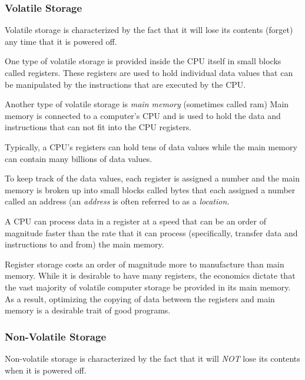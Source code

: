 \subsubsection{Volatile Storage}
\label{VolatileStorage}

Volatile storage is characterized by the fact that it will lose its
contents (forget) any time that it is powered off.

One type of volatile storage is provided inside the CPU itself in 
small blocks called \glspl{register}.  These registers are used to 
hold individual data values that can be manipulated by the instructions
that are executed by the CPU.  

Another type of volatile storage is {\em main memory}
(sometimes called \acrshort{ram})
Main memory is connected to a computer's CPU and is used to hold
the data and instructions that can not fit into the CPU registers.

Typically, a CPU's registers can hold tens of data values while
the main memory can contain many billions of data values.

To keep track of the data values, each register is assigned a number and
the main memory is broken up into small blocks called \gls{byte}s that 
each assigned a number called an \gls{address} 
(an {\em address} is often referred to as a {\em location.}

A CPU can process data in a register at a speed that can be an order 
of magnitude faster than the rate that it can process (specifically,
transfer data and instructions to and from) the main memory.  

Register storage costs an order of magnitude more to manufacture than
main memory.  While it is desirable to have many registers, the economics 
dictate that the vast majority of volatile computer storage be provided
in its main memory.  As a result, optimizing the copying of data between 
the registers and main memory is a desirable trait of good programs.

\subsubsection{Non-Volatile Storage}

Non-volatile storage is characterized by the fact that it will {\em NOT} 
lose its contents when it is powered off.

